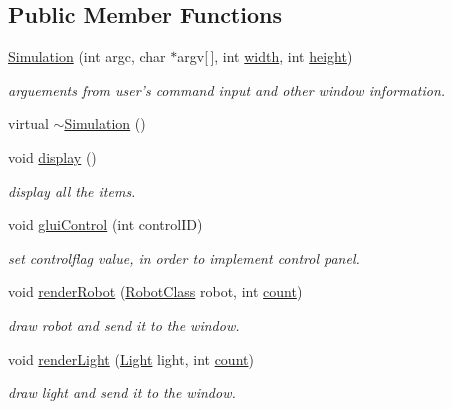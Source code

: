 \subsection*{Public Member Functions}
\begin{DoxyCompactItemize}
\item 
\hyperlink{classSimulation_a4c669ceaa34c7130966ce45f9de75fbe}{Simulation} (int argc, char $\ast$argv\mbox{[}$\,$\mbox{]}, int \hyperlink{classBaseGfxApp_ace089a1a94fb6bb0bc17e1b7fa48e05d}{width}, int \hyperlink{classBaseGfxApp_aa253dbe16a20c40e0a1bf8ff942ceea3}{height})
\begin{DoxyCompactList}\small\item\em arguements from user's command input and other window information. \end{DoxyCompactList}\item 
virtual \hyperlink{classSimulation_a80fad3f57dfaf195a36f7bc49bc88279}{$\sim$\-Simulation} ()
\item 
void \hyperlink{classSimulation_a449dcb7d97dfba99efe770de2f399c31}{display} ()
\begin{DoxyCompactList}\small\item\em display all the items. \end{DoxyCompactList}\item 
void \hyperlink{classSimulation_a1607cd18e552ab9f4a6f57d362f7121a}{glui\-Control} (int control\-I\-D)
\begin{DoxyCompactList}\small\item\em set controlflag value, in order to implement control panel. \end{DoxyCompactList}\item 
void \hyperlink{classSimulation_aa975d7962f1ea62a2c3a1ae42392d906}{render\-Robot} (\hyperlink{classRobotClass}{Robot\-Class} robot, int \hyperlink{classSimulation_a5a5e26d75c6a6dee8cdfecc7669545e3}{count})
\begin{DoxyCompactList}\small\item\em draw robot and send it to the window. \end{DoxyCompactList}\item 
void \hyperlink{classSimulation_a43ebad86548efc30eb3a3e9959002aaa}{render\-Light} (\hyperlink{classLight}{Light} light, int \hyperlink{classSimulation_a5a5e26d75c6a6dee8cdfecc7669545e3}{count})
\begin{DoxyCompactList}\small\item\em draw light and send it to the window. \end{DoxyCompactList}\item 

\end{DoxyCompactItemize}

